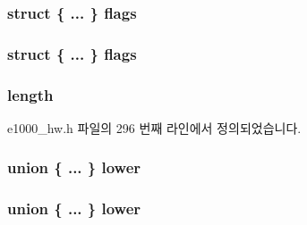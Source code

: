 \subsubsection[{\texorpdfstring{flags}{flags}}]{\setlength{\rightskip}{0pt plus 5cm}struct \{ ... \}   flags}\hypertarget{structe1000__tx__desc_af005f0926199c1356b7d6615aabc3cfd}{}\label{structe1000__tx__desc_af005f0926199c1356b7d6615aabc3cfd}
\subsubsection[{\texorpdfstring{flags}{flags}}]{\setlength{\rightskip}{0pt plus 5cm}struct \{ ... \}   flags}\hypertarget{structe1000__tx__desc_ae89f9fdc53a65abd469bd65af3f425a3}{}\label{structe1000__tx__desc_ae89f9fdc53a65abd469bd65af3f425a3}
\subsubsection[{\texorpdfstring{length}{length}}]{ length}\hypertarget{structe1000__tx__desc_adb05ebb496f195c1ce4e49f46fb420f0}{}\label{structe1000__tx__desc_adb05ebb496f195c1ce4e49f46fb420f0}


e1000\+\_\+hw.\+h 파일의 296 번째 라인에서 정의되었습니다.

\subsubsection[{\texorpdfstring{lower}{lower}}]{\setlength{\rightskip}{0pt plus 5cm}union \{ ... \}   lower}\hypertarget{structe1000__tx__desc_a1a88623bca06a3924c8cfaadeb8df803}{}\label{structe1000__tx__desc_a1a88623bca06a3924c8cfaadeb8df803}
\subsubsection[{\texorpdfstring{lower}{lower}}]{\setlength{\rightskip}{0pt plus 5cm}union \{ ... \}   lower}\hypertarget{structe1000__tx__desc_aa48d5c36921e2d5fc081bf4c2e5cd8d6}{}\label{structe1000__tx__desc_aa48d5c36921e2d5fc081bf4c2e5cd8d6}
